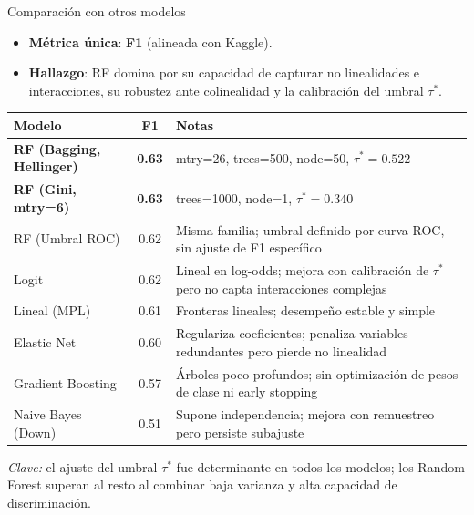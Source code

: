 \documentclass[10pt]{beamer}
\begin{document}
\begin{frame}{Comparación con otros modelos}
\small
\begin{itemize}
  \item \textbf{Métrica única}: \textbf{F1} (alineada con Kaggle).
  \item \textbf{Hallazgo}: RF domina por su capacidad de capturar no linealidades e interacciones, su robustez ante colinealidad y la calibración del umbral $\tau^{*}$.
\end{itemize}
\medskip
\small
\begin{tabularx}{\textwidth}{l c X}
\toprule
\textbf{Modelo} & \textbf{F1} & \textbf{Notas} \\
\midrule
\textbf{RF (Bagging, Hellinger)} & \textbf{0.63} & mtry=26, trees=500, node=50, $\tau^{*}=0.522$ \\
\textbf{RF (Gini, mtry=6)}       & \textbf{0.63} & trees=1000, node=1, $\tau^{*}=0.340$ \\
RF (Umbral ROC)         & 0.62 & Misma familia; umbral definido por curva ROC, sin ajuste de F1 específico \\
Logit                            & 0.62 & Lineal en log-odds; mejora con calibración de $\tau^{*}$ pero no capta interacciones complejas \\
Lineal (MPL)                     & 0.61 & Fronteras lineales; desempeño estable y simple \\
Elastic Net                      & 0.60 & Regulariza coeficientes; penaliza variables redundantes pero pierde no linealidad \\
Gradient Boosting                & 0.57 & Árboles poco profundos; sin optimización de pesos de clase ni early stopping \\
Naive Bayes (Down)               & 0.51 & Supone independencia; mejora con remuestreo pero persiste subajuste \\
\bottomrule
\end{tabularx}
\medskip

\footnotesize\textit{Clave:} el ajuste del umbral $\tau^{*}$ fue determinante en todos los modelos; los Random Forest superan al resto al combinar baja varianza y alta capacidad de discriminación.
\end{frame}
\end{document}

